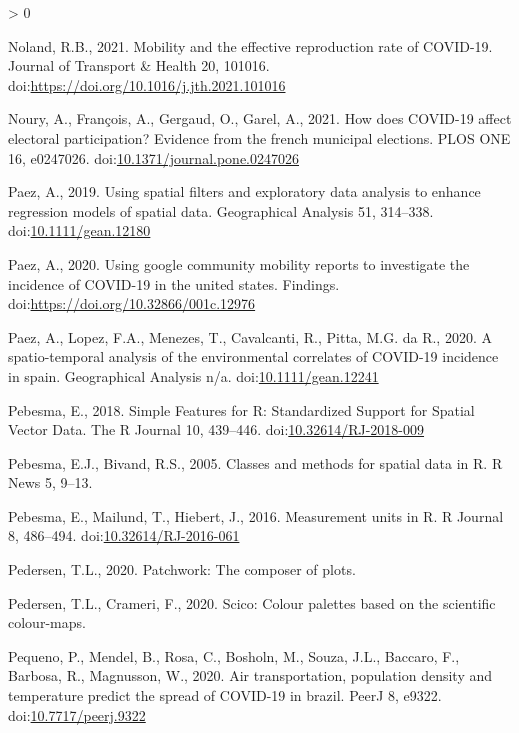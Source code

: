 \documentclass[]{elsarticle} %
\newlength{\cslhangindent}
\newenvironment{CSLReferences}[2] %
 {%
  \setlength{\parindent}{0pt}
  \ifodd #1 \everypar{\setlength{\hangindent}{\cslhangindent}}\ignorespaces\fi
  \ifnum #2 > 0
  \setlength{\parskip}{#2\baselineskip}
  \fi
 }%
 {}
\begin{document}
\begin{CSLReferences}{1}{0}
\leavevmode\hypertarget{ref-Noland2021mobility}{}%
Noland, R.B., 2021. Mobility and the effective reproduction rate of
COVID-19. Journal of Transport \& Health 20, 101016.
doi:\url{https://doi.org/10.1016/j.jth.2021.101016}

\leavevmode\hypertarget{ref-Noury2021how}{}%
Noury, A., François, A., Gergaud, O., Garel, A., 2021. How does COVID-19
affect electoral participation? Evidence from the french municipal
elections. PLOS ONE 16, e0247026.
doi:\href{https://doi.org/10.1371/journal.pone.0247026}{10.1371/journal.pone.0247026}

\leavevmode\hypertarget{ref-Paez2019using}{}%
Paez, A., 2019. Using spatial filters and exploratory data analysis to
enhance regression models of spatial data. Geographical Analysis 51,
314--338.
doi:\href{https://doi.org/10.1111/gean.12180}{10.1111/gean.12180}

\leavevmode\hypertarget{ref-Paez2020using}{}%
Paez, A., 2020. Using google community mobility reports to investigate
the incidence of COVID-19 in the united states. Findings.
doi:\url{https://doi.org/10.32866/001c.12976}

\leavevmode\hypertarget{ref-Paez2020spatio}{}%
Paez, A., Lopez, F.A., Menezes, T., Cavalcanti, R., Pitta, M.G. da R.,
2020. A spatio-temporal analysis of the environmental correlates of
COVID-19 incidence in spain. Geographical Analysis n/a.
doi:\href{https://doi.org/10.1111/gean.12241}{10.1111/gean.12241}

\leavevmode\hypertarget{ref-sf2018}{}%
Pebesma, E., 2018. {Simple Features for R: Standardized Support for
Spatial Vector Data}. {The R Journal} 10, 439--446.
doi:\href{https://doi.org/10.32614/RJ-2018-009}{10.32614/RJ-2018-009}

\leavevmode\hypertarget{ref-sp2005}{}%
Pebesma, E.J., Bivand, R.S., 2005. Classes and methods for spatial data
in {R}. R News 5, 9--13.

\leavevmode\hypertarget{ref-units2016}{}%
Pebesma, E., Mailund, T., Hiebert, J., 2016. Measurement units in {R}. R
Journal 8, 486--494.
doi:\href{https://doi.org/10.32614/RJ-2016-061}{10.32614/RJ-2016-061}

\leavevmode\hypertarget{ref-R-patchwork}{}%
Pedersen, T.L., 2020. Patchwork: The composer of plots.

\leavevmode\hypertarget{ref-R-scico}{}%
Pedersen, T.L., Crameri, F., 2020. Scico: Colour palettes based on the
scientific colour-maps.

\leavevmode\hypertarget{ref-Pequeno2020air}{}%
Pequeno, P., Mendel, B., Rosa, C., Bosholn, M., Souza, J.L., Baccaro,
F., Barbosa, R., Magnusson, W., 2020. Air transportation, population
density and temperature predict the spread of COVID-19 in brazil. PeerJ
8, e9322.
doi:\href{https://doi.org/10.7717/peerj.9322}{10.7717/peerj.9322}


\end{CSLReferences}
\end{document}
